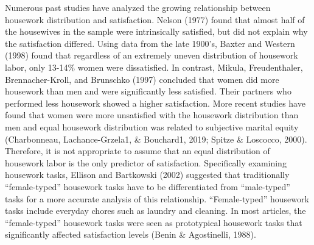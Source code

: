 \documentclass[
  man,floatsintext]{apa6}
\begin{document}
Numerous past studies have analyzed the growing relationship between housework distribution and satisfaction. Nelson (1977) found that almost half of the housewives in the sample were intrinsically satisfied, but did not explain why the satisfaction differed. Using data from the late 1900's, Baxter and Western (1998) found that regardless of an extremely uneven distribution of housework labor, only 13-14\% women were dissatisfied. In contrast, Mikula, Freudenthaler, Brennacher-Kroll, and Brunschko (1997) concluded that women did more housework than men and were significantly less satisfied. Their partners who performed less housework showed a higher satisfaction. More recent studies have found that women were more unsatisfied with the housework distribution than men and equal housework distribution was related to subjective marital equity (Charbonneau, Lachance-Grzela1, \& Bouchard1, 2019; Spitze \& Loscocco, 2000). Therefore, it is not appropriate to assume that an equal distribution of housework labor is the only predictor of satisfaction. Specifically examining housework tasks, Ellison and Bartkowski (2002) suggested that traditionally ``female-typed'' housework tasks have to be differentiated from ``male-typed'' tasks for a more accurate analysis of this relationship. ``Female-typed'' housework tasks include everyday chores such as laundry and cleaning. In most articles, the ``female-typed'' housework tasks were seen as prototypical housework tasks that significantly affected satisfaction levels (Benin \& Agostinelli, 1988).
\end{document}

